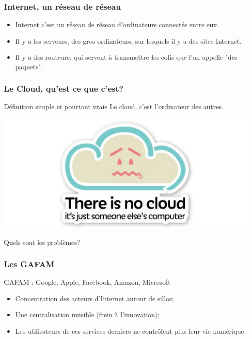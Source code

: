 \documentclass{beamer}
\begin{document}
\begin{frame}
\frametitle{Internet, un réseau de réseau}
\begin{itemize}
\item Internet c'est un réseau de réseau d'ordinateurs connectés entre eux.
\item Il y a les serveurs, des gros ordinateurs, sur lesquels il y a des sites Internet.
\item Il y a des routeurs, qui servent à transmettre les colis que l'on appelle "des paquets". 
\end{itemize}
\end{frame}
\begin{frame}
\frametitle{Le Cloud, qu'est ce que c'est?}
\begin{block}{Définition simple et pourtant vraie}
Le cloud, c'est l'ordinateur des autres.
\end{block}
\begin{center}
\includegraphics[scale=0.4]{./images/cloud.png}
\end{center}
\end{frame}
\begin{frame}
\begin{center}
\Huge{Quels sont les problèmes?}
\end{center}
\end{frame}
\begin{frame}
\frametitle{Les GAFAM}
GAFAM : Google, Apple, Facebook, Amazon, Microsoft
\begin{itemize}
\item Concentration des acteurs d’Internet autour de sillos;
\item Une centralisation nuisible (frein à l'innovation);
\item  Les utilisateurs de ces services derniers ne contrôlent plus leur vie numérique.
\end{itemize}
\end{frame}
\end{document}
